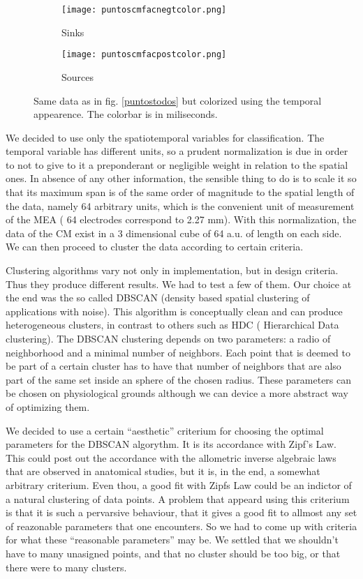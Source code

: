 \documentclass{article}
\begin{document}
\begin{figure}
\centering
\begin{subfigure}{0.40\textwidth}
\texttt{[image: puntoscmfacnegtcolor.png]}
\caption{Sinks}
\end{subfigure}
\begin{subfigure}{0.40\textwidth}
\texttt{[image: puntoscmfacpostcolor.png]}
\caption{Sources}
\end{subfigure}

\caption{Same data as in fig. \ref{puntostodos} but colorized using
the temporal appearence. The colorbar is in miliseconds.
}\label{puntosconcolor}

\end{figure}


We decided to  use only the spatiotemporal variables for classification. 
The temporal variable has different units, so a prudent normalization is due
in order to not to give to it a preponderant or negligible weight in relation to the
spatial ones. In absence of any other information, the sensible thing to do is to
scale it so that its maximum span is of the same order of magnitude to the
spatial length of the data, namely 64 arbitrary units, which is the convenient unit
of measurement of the MEA ( 64 electrodes correspond to 2.27 mm).
With this normalization, the data of the CM exist in a 3 dimensional cube of 64 a.u.
of length on each side. We can then proceed to cluster the data according to
certain criteria.

Clustering algorithms vary not only in implementation, but in design criteria.
Thus they produce different results. We had to test a few of them. Our choice at the
end was the so called DBSCAN (density based spatial clustering of applications with noise).
This algorithm is conceptually clean and can produce heterogeneous clusters, in contrast
to others such as HDC ( Hierarchical Data clustering). The DBSCAN clustering depends
on two parameters: a radio of neighborhood and a minimal number of neighbors. Each
point that is deemed to be part of a certain cluster has to have that number of neighbors
that are also part of the same set inside an sphere of the chosen radius. These
parameters can be chosen on physiological grounds although we can device a more
abstract way of optimizing them. 

We decided to use a certain ``aesthetic'' criterium for choosing the optimal parameters
for the DBSCAN algorythm.  It is its accordance with Zipf's Law.  This could post out
the accordance with the allometric inverse algebraic laws that are observed in
anatomical studies, but it is, in the end, a somewhat arbitrary criterium. Even thou, a good
fit with Zipfs Law could be an indictor of a natural clustering of data points.
A problem that appeard using this criterium is that it is such a pervarsive
behaviour, that it gives a good fit to allmost any set of reazonable parameters
that one encounters. So we had to come up with criteria for what these ``reasonable
parameters'' may be.  We settled that we shouldn't have to many unasigned points, and
that no cluster should be too big, or that there were to many clusters. 
\end{document}
